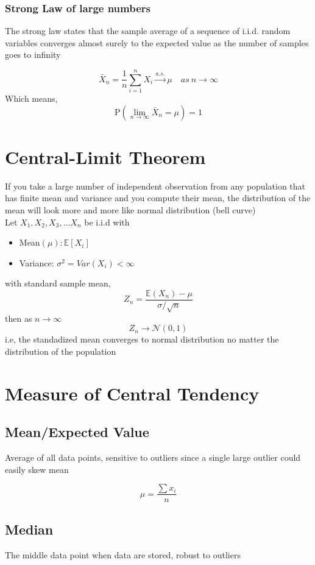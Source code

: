 \documentclass[12pt]{extarticle}
\begin{document}
\subsubsection{Strong Law of large numbers}
The strong law states that the sample average of a sequence of i.i.d. random variables converges almost surely to the expected value as the number of samples goes to infinity 

$$\bar{X}_n = \frac{1}{n} \sum_{i=1}^n X_i \xrightarrow{a.s.} \mu \quad as\ n \to \infty$$
Which means, 
$$ \mathrm{P}(\lim_{n \to \infty} \bar{X}_n = \mu ) = 1 $$

\section{Central-Limit Theorem}
If you take a large number of independent observation from any population that has finite mean 
and variance and you compute their mean, the distribution of the mean will look more and more
like normal distribution (bell curve) \\
Let $X_1,X_2,X_3,...X_n$ be i.i.d with 
\begin{itemize}
    \item Mean$(\mu): \mathbb{E}[X_i]$
    \item Variance: $\sigma^2 = Var(X_i) < \infty$
\end{itemize}
with standard sample mean, \\
$$Z_n = \frac{\mathbb{E}(X_n)-\mu}{\sigma/\sqrt{n}}$$
then as $n \to \infty$
$$ Z_n \longrightarrow \mathcal{N}(0,1) $$
i.e, the standadized mean converges to normal distribution no matter the distribution of the population

\section{Measure of Central Tendency} 

\subsection{Mean/Expected Value} 
Average of all data points, sensitive to outliers since a single large outlier could easily skew mean 

$$ \mu = \frac{\sum x_i}{n} $$ 

\subsection{Median}
The middle data point when data are stored, robust to outliers 
\end{document}

